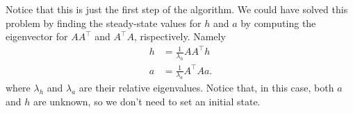 \begin{enumerate}
  Notice that this is just the first step of the algorithm. We could have solved
  this problem by finding the steady-state values for $h$ and $a$ by computing
  the eigenvector for $AA^\top$ and $A^\top A$, rispectively. Namely
  \begin{align*}
    h &= \frac{1}{\lambda_h}AA^\top h \\
    a &= \frac{1}{\lambda_a}A^\top A a.
  \end{align*}
  where $\lambda_h$ and $\lambda_a$ are their relative eigenvalues. Notice that,
  in this case, both $a$ and $h$ are unknown, so we don't need to set an initial
  state.

\end{enumerate}
